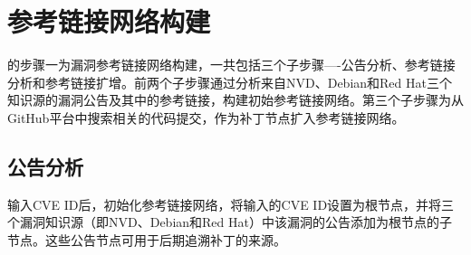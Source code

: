 
\section{参考链接网络构建}
\tool 的步骤一为漏洞参考链接网络构建，一共包括三个子步骤----公告分析、参考链接分析和参考链接扩增。前两个子步骤通过分析来自NVD、Debian和Red Hat三个知识源的漏洞公告及其中的参考链接，构建初始参考链接网络。第三个子步骤为从GitHub平台中搜索相关的代码提交，作为补丁节点扩入参考链接网络。

\subsection{公告分析} \label{sec:advisory analysis}
输入CVE ID后，\tool 初始化参考链接网络，将输入的CVE ID设置为根节点，并将三个漏洞知识源（即NVD、Debian和Red Hat）中该漏洞的公告添加为根节点的子节点。这些公告节点可用于后期追溯补丁的来源。%

